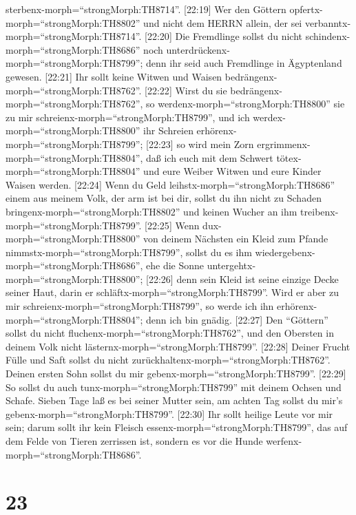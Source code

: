sterbenx-morph=``strongMorph:TH8714''.  {[}22:19{]} Wer den
Göttern opfertx-morph=``strongMorph:TH8802'' und nicht dem HERRN allein,
der sei verbanntx-morph=``strongMorph:TH8714''. 
{[}22:20{]} Die Fremdlinge sollst du nicht
schindenx-morph=``strongMorph:TH8686'' noch
unterdrückenx-morph=``strongMorph:TH8799''; denn ihr seid auch
Fremdlinge in Ägyptenland gewesen.  {[}22:21{]} Ihr sollt
keine Witwen und Waisen bedrängenx-morph=``strongMorph:TH8762''.
 {[}22:22{]} Wirst du sie
bedrängenx-morph=``strongMorph:TH8762'', so
werdenx-morph=``strongMorph:TH8800'' sie zu mir
schreienx-morph=``strongMorph:TH8799'', und ich
werdex-morph=``strongMorph:TH8800'' ihr Schreien
erhörenx-morph=``strongMorph:TH8799'';  {[}22:23{]} so wird
mein Zorn ergrimmenx-morph=``strongMorph:TH8804'', daß ich euch mit dem
Schwert tötex-morph=``strongMorph:TH8804'' und eure Weiber Witwen und
eure Kinder Waisen werden.  {[}22:24{]} Wenn du Geld
leihstx-morph=``strongMorph:TH8686'' einem aus meinem Volk, der arm ist
bei dir, sollst du ihn nicht zu Schaden
bringenx-morph=``strongMorph:TH8802'' und keinen Wucher an ihm
treibenx-morph=``strongMorph:TH8799''.  {[}22:25{]} Wenn
dux-morph=``strongMorph:TH8800'' von deinem Nächsten ein Kleid zum
Pfande nimmstx-morph=``strongMorph:TH8799'', sollst du es ihm
wiedergebenx-morph=``strongMorph:TH8686'', ehe die Sonne
untergehtx-morph=``strongMorph:TH8800'';  {[}22:26{]} denn
sein Kleid ist seine einzige Decke seiner Haut, darin er
schläftx-morph=``strongMorph:TH8799''. Wird er aber zu mir
schreienx-morph=``strongMorph:TH8799'', so werde ich ihn
erhörenx-morph=``strongMorph:TH8804''; denn ich bin gnädig.
 {[}22:27{]} Den ``Göttern'' sollst du nicht
fluchenx-morph=``strongMorph:TH8762'', und den Obersten in deinem Volk
nicht lästernx-morph=``strongMorph:TH8799''.  {[}22:28{]}
Deiner Frucht Fülle und Saft sollst du nicht
zurückhaltenx-morph=``strongMorph:TH8762''. Deinen ersten Sohn sollst du
mir gebenx-morph=``strongMorph:TH8799''.  {[}22:29{]} So
sollst du auch tunx-morph=``strongMorph:TH8799'' mit deinem Ochsen und
Schafe. Sieben Tage laß es bei seiner Mutter sein, am achten Tag sollst
du mir's gebenx-morph=``strongMorph:TH8799''.  {[}22:30{]}
Ihr sollt heilige Leute vor mir sein; darum sollt ihr kein Fleisch
essenx-morph=``strongMorph:TH8799'', das auf dem Felde von Tieren
zerrissen ist, sondern es vor die Hunde
werfenx-morph=``strongMorph:TH8686''.

\hypertarget{section-22}{%
\section{23}\label{section-22}}

